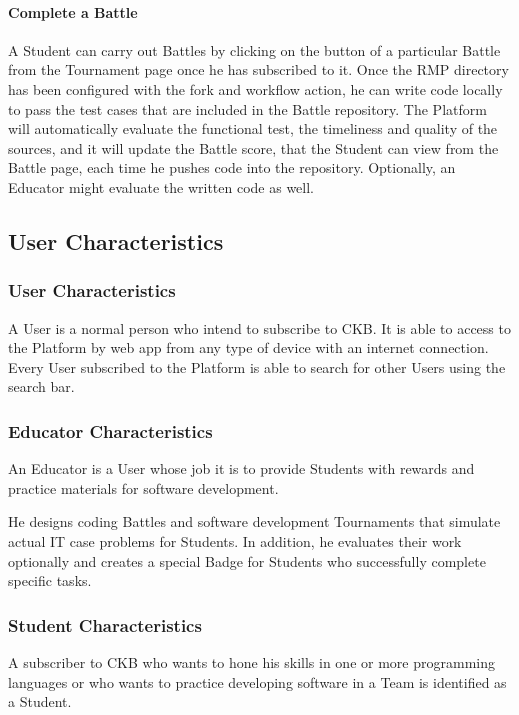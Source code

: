 \paragraph{Complete a Battle}
A Student can carry out Battles by clicking on the button of a particular Battle from the Tournament page once he has subscribed to it. Once the RMP directory has been configured with the fork and workflow action, he can write code 
locally to pass the test cases that are included in the Battle repository. The Platform will automatically evaluate the functional test, the timeliness and quality of the sources, and it will update the Battle score, that the Student 
can view from the Battle page, each time he pushes code into the repository. Optionally, an Educator might evaluate the written code as well.
\newpage

\subsection{User Characteristics}
\subsubsection{User Characteristics}
A User is a normal person who intend to subscribe to CKB. It is able to access to the Platform by web app from any type of device with an internet connection.\\
Every User subscribed to the Platform is able to search for other Users using the search bar.

\subsubsection{Educator Characteristics}
An Educator is a User whose job it is to provide Students with rewards and practice materials for software development.

He designs coding Battles and software development Tournaments that simulate actual IT case problems for Students. In addition, he evaluates their work optionally and creates a special Badge for Students who successfully complete 
specific tasks.

\subsubsection{Student Characteristics}
A subscriber to CKB who wants to hone his skills in one or more programming languages or who wants to practice developing software in a Team is identified as a Student.

